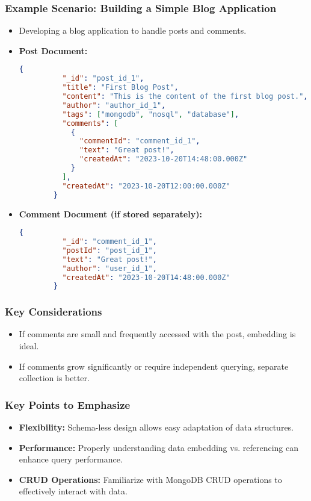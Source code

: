 \documentclass[aspectratio=169]{beamer}
\begin{document}
\begin{frame}[fragile]
    \frametitle{Example Scenario: Building a Simple Blog Application}
    \begin{itemize}
        \item Developing a blog application to handle posts and comments.
        \item \textbf{Post Document:}
        \begin{lstlisting}[language=json]
        {
          "_id": "post_id_1",
          "title": "First Blog Post",
          "content": "This is the content of the first blog post.",
          "author": "author_id_1",
          "tags": ["mongodb", "nosql", "database"],
          "comments": [
            {
              "commentId": "comment_id_1",
              "text": "Great post!",
              "createdAt": "2023-10-20T14:48:00.000Z"
            }
          ],
          "createdAt": "2023-10-20T12:00:00.000Z"
        }
        \end{lstlisting}
        \item \textbf{Comment Document (if stored separately):}
        \begin{lstlisting}[language=json]
        {
          "_id": "comment_id_1",
          "postId": "post_id_1",
          "text": "Great post!",
          "author": "user_id_1",
          "createdAt": "2023-10-20T14:48:00.000Z"
        }
        \end{lstlisting}
    \end{itemize}
\end{frame}

\begin{frame}[fragile]
    \frametitle{Key Considerations}
    \begin{itemize}
        \item If comments are small and frequently accessed with the post, embedding is ideal.
        \item If comments grow significantly or require independent querying, separate collection is better.
    \end{itemize}
\end{frame}

\begin{frame}[fragile]
    \frametitle{Key Points to Emphasize}
    \begin{itemize}
        \item \textbf{Flexibility:} Schema-less design allows easy adaptation of data structures.
        \item \textbf{Performance:} Properly understanding data embedding vs. referencing can enhance query performance.
        \item \textbf{CRUD Operations:} Familiarize with MongoDB CRUD operations to effectively interact with data.
    \end{itemize}
\end{frame}
\end{document}
